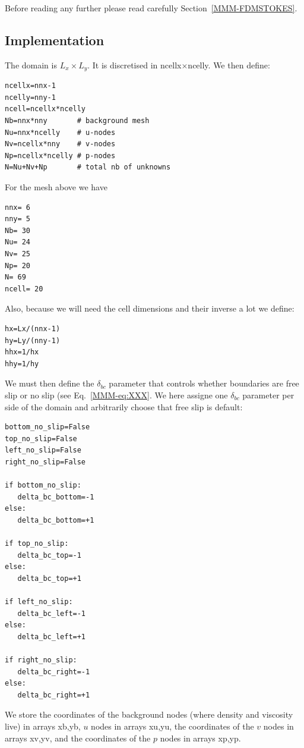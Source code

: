 Before reading any further please read carefully Section~\ref{MMM-FDMSTOKES}. 



\subsection*{Implementation}

The domain is $L_x \times L_y$. 
It is discretised in {\python ncellx}$\times${\python ncelly}.
We then define:
\begin{lstlisting}
ncellx=nnx-1
ncelly=nny-1
ncell=ncellx*ncelly
Nb=nnx*nny       # background mesh
Nu=nnx*ncelly    # u-nodes
Nv=ncellx*nny    # v-nodes  
Np=ncellx*ncelly # p-nodes
N=Nu+Nv+Np       # total nb of unknowns
\end{lstlisting}
For the mesh above we have

\begin{verbatim}
nnx= 6
nny= 5
Nb= 30
Nu= 24
Nv= 25
Np= 20
N= 69
ncell= 20
\end{verbatim}


Also, because we will need the cell dimensions and their inverse a lot we define:
\begin{lstlisting}
hx=Lx/(nnx-1)
hy=Ly/(nny-1)
hhx=1/hx
hhy=1/hy
\end{lstlisting}

We must then define the $\delta_{bc}$ parameter that 
controls whether boundaries are free slip or no slip
(see Eq.~\eqref{MMM-eq:XXX}.
We here assigne one $\delta_{bc}$ parameter per side 
of the domain and arbitrarily choose that free slip is 
default:

\begin{lstlisting}
bottom_no_slip=False
top_no_slip=False
left_no_slip=False
right_no_slip=False

if bottom_no_slip:
   delta_bc_bottom=-1
else:
   delta_bc_bottom=+1

if top_no_slip:
   delta_bc_top=-1
else:
   delta_bc_top=+1

if left_no_slip:
   delta_bc_left=-1
else:
   delta_bc_left=+1

if right_no_slip:
   delta_bc_right=-1
else:
   delta_bc_right=+1
\end{lstlisting}



We store the coordinates of the background nodes (where 
density and viscosity live) in arrays {\python xb,yb}, 
$u$ nodes in arrays {\python xu,yu},
the coordinates of the $v$ nodes in arrays {\python xv,yv},
and the coordinates of the $p$ nodes in arrays {\python xp,yp}.

